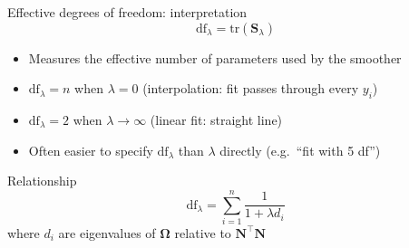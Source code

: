 \documentclass[aspectratio=169]{beamer}
\begin{document}
\begin{frame}{Effective degrees of freedom: interpretation}
\[
\text{df}_\lambda = \text{tr}(\mathbf{S}_\lambda)
\]

\begin{itemize}
    \item Measures the effective number of parameters used by the smoother
    \item $\text{df}_\lambda = n$ when $\lambda = 0$ (interpolation: fit passes through every $y_i$)
    \item $\text{df}_\lambda = 2$ when $\lambda \to \infty$ (linear fit: straight line)
    \item Often easier to specify $\text{df}_\lambda$ than $\lambda$ directly (e.g.\ “fit with 5 df”)
\end{itemize}

\begin{block}{Relationship}
\[
\text{df}_\lambda = \sum_{i=1}^{n} \frac{1}{1 + \lambda d_i}
\]
where $d_i$ are eigenvalues of $\boldsymbol{\Omega}$ relative to $\mathbf{N}^\top \mathbf{N}$
\end{block}
\end{frame}
\end{document}
